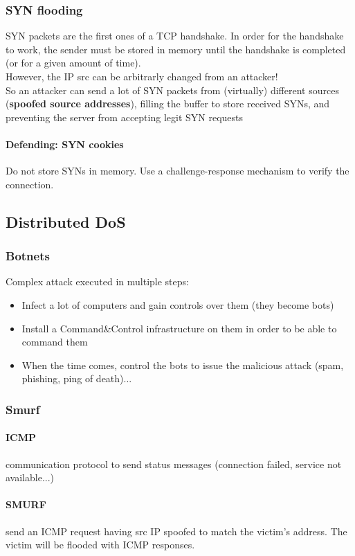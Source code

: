 \documentclass{article}
\begin{document}
\subsubsection{SYN flooding}
SYN packets are the first ones of a TCP handshake. In order for the handshake to work, the sender must be stored in memory until the handshake is completed (or for a given amount of time).\\
However, the IP src can be arbitrarly changed from an attacker!\\
So an attacker can send a lot of SYN packets from (virtually) different sources (\textbf{spoofed source addresses}), filling the buffer to store received SYNs, and preventing the server from accepting legit SYN requests
\paragraph{Defending: SYN cookies} Do not store SYNs in memory. Use a challenge-response mechanism to verify the connection.
\subsection{Distributed DoS}
\subsubsection{Botnets} Complex attack executed in multiple steps:
\begin{itemize}
\item Infect a lot of computers and gain controls over them (they become bots)
\item Install a Command\&Control infrastructure on them in order to be able to command them
\item When the time comes, control the bots to issue the malicious attack (spam, phishing, ping of death)...
\end{itemize}
\subsubsection{Smurf}
\paragraph{ICMP} communication protocol to send status messages (connection failed, service not available...)
\paragraph{SMURF} send an ICMP request having src IP spoofed to match the victim's address. The victim will be flooded with ICMP responses.
\end{document}
